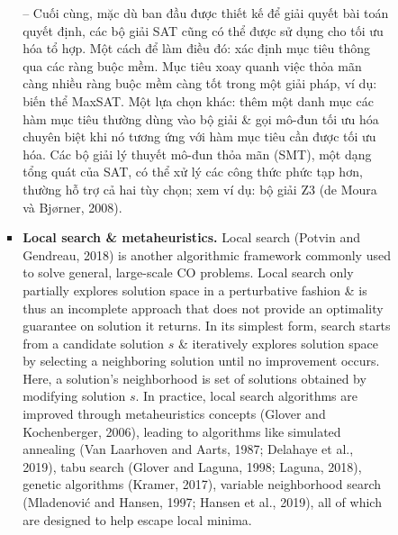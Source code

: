 \documentclass{article}
\begin{document}
\begin{itemize}
\begin{itemize}
\begin{itemize}
\begin{itemize}
                -- Cuối cùng, mặc dù ban đầu được thiết kế để giải quyết bài toán quyết định, các bộ giải SAT cũng có thể được sử dụng cho tối ưu hóa tổ hợp. Một cách để làm điều đó: xác định mục tiêu thông qua các ràng buộc mềm. Mục tiêu xoay quanh việc thỏa mãn càng nhiều ràng buộc mềm càng tốt trong một giải pháp, ví dụ: biến thể MaxSAT. Một lựa chọn khác: thêm một danh mục các hàm mục tiêu thường dùng vào bộ giải \& gọi mô-đun tối ưu hóa chuyên biệt khi nó tương ứng với hàm mục tiêu cần được tối ưu hóa. Các bộ giải lý thuyết mô-đun thỏa mãn (SMT), một dạng tổng quát của SAT, có thể xử lý các công thức phức tạp hơn, thường hỗ trợ cả hai tùy chọn; xem ví dụ: bộ giải Z3 (de Moura và Bjørner, 2008).
                \item {\bf Local search \& metaheuristics.} Local search (Potvin and Gendreau, 2018) is another algorithmic framework commonly used to solve general, large-scale CO problems. Local search only partially explores solution space in a perturbative fashion \& is thus an incomplete approach that does not provide an optimality guarantee on solution it returns. In its simplest form, search starts from a candidate solution $s$ \& iteratively explores solution space by selecting a neighboring solution until no improvement occurs. Here, a solution's neighborhood is set of solutions obtained by modifying solution $s$. In practice, local search algorithms are improved through metaheuristics concepts (Glover and Kochenberger, 2006), leading to algorithms like simulated annealing (Van Laarhoven and Aarts, 1987; Delahaye et al., 2019), tabu search (Glover and Laguna, 1998; Laguna, 2018), genetic algorithms (Kramer, 2017), variable neighborhood search (Mladenović and Hansen, 1997; Hansen et al., 2019), all of which are designed to help escape local minima.


\end{itemize}
\end{itemize}
\end{itemize}
\end{itemize}
\end{document}
